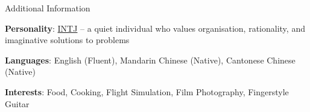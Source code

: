 \documentclass{cv}
\begin{document}
\begin{cvsection}{Additional Information}
\item \textbf{Personality}: \href{https://www.16personalities.com/intj-personality}{INTJ} -- a quiet individual who values organisation, rationality, and imaginative solutions to problems
\item \textbf{Languages}: English (Fluent), Mandarin Chinese (Native), Cantonese Chinese (Native)
\item \textbf{Interests}: Food, Cooking, Flight Simulation, Film Photography, Fingerstyle Guitar
\end{cvsection}
\end{document}
